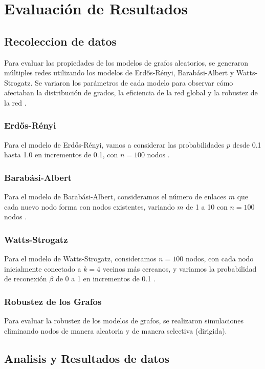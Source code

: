 \chapter{Evaluación de Resultados}

\section{Recoleccion de datos}
Para evaluar las propiedades de los modelos de grafos aleatorios, se generaron múltiples redes utilizando los modelos de Erdős-Rényi, Barabási-Albert y Watts-Strogatz. Se variaron los parámetros de cada modelo para observar cómo afectaban la distribución de grados, la eficiencia de la red global y la robustez de la red .

\subsection{Erdős-Rényi}
Para el modelo de Erdős-Rényi, vamos a considerar las probabilidades 
\(p\) desde 0.1 hasta 1.0 en incrementos de 0.1, con \(n=100\) nodos .
\subsection{Barabási-Albert}
Para el modelo de Barabási-Albert, consideramos el número de enlaces 
\(m\) que cada nuevo nodo forma con nodos existentes, variando \(m\) de 1 a 10 con \(n=100\) nodos .
\subsection{Watts-Strogatz}
Para el modelo de Watts-Strogatz, consideramos 
\(n=100\) nodos, con cada nodo inicialmente conectado a 
\(k=4\) vecinos más cercanos, y variamos la probabilidad de reconexión 
\(\beta \) de 0 a 1 en incrementos de 0.1 .

\subsection{Robustez de los Grafos}
Para evaluar la robustez de los modelos de grafos, se realizaron simulaciones eliminando nodos de manera aleatoria y de manera selectiva (dirigida).

\section{Analisis y Resultados de datos}

